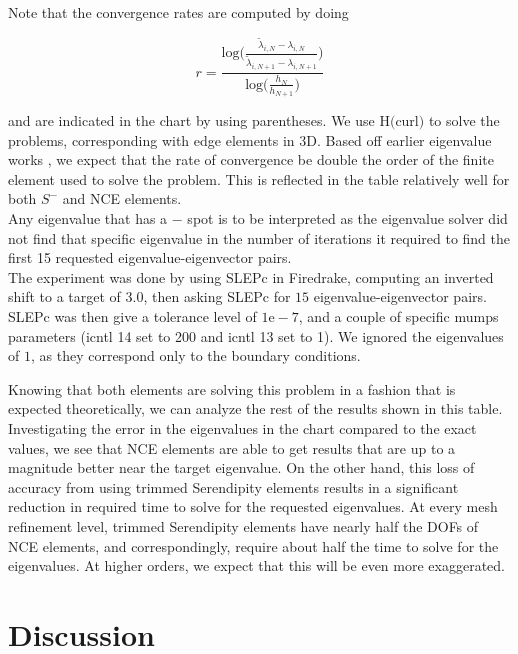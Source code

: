 \documentclass[manuscript,screen]{acmart}
\begin{document}
Note that the convergence rates are computed by doing

\[r = \frac{\text{log}\bigg(\frac{\tilde{\lambda}_{i,N} - \lambda_{i,N}}{\tilde{\lambda}_{i,N+1} - \lambda_{i,N+1}} \bigg)}{\text{log}\bigg( \frac{h_N}{h_{N+1}} \bigg)} \]

\noindent and are indicated in the chart by using parentheses.  We use H$($curl$)$ to solve the problems, corresponding with edge elements in 3D.  Based off earlier eigenvalue works \cite{boffi2010finite}, we expect that the rate of convergence be double the order of the finite element used to solve the problem.  This is reflected in the table relatively well for both $S^-$ and NCE elements.\\

Any eigenvalue that has a $-$ spot is to be interpreted as the eigenvalue solver did not find that specific eigenvalue in the number of iterations it required to find the first 15 requested eigenvalue-eigenvector pairs.\\

The experiment was done by using SLEPc in Firedrake, computing an inverted shift to a target of $3.0$, then asking SLEPc for $15$ eigenvalue-eigenvector pairs.  SLEPc was then give a tolerance level of $1\text{e}-7$, and a couple of specific mumps parameters (icntl 14 set to 200 and icntl 13 set to 1).  We ignored the eigenvalues of $1$, as they correspond only to the boundary conditions. 

Knowing that both elements are solving this problem in a fashion that is expected theoretically, we can analyze the rest of the results shown in this table.  Investigating the error in the eigenvalues in the chart compared to the exact values, we see that NCE elements are able to get results that are up to a magnitude better near the target eigenvalue.  On the other hand, this loss of accuracy from using trimmed Serendipity elements results in a significant reduction in required time to solve for the requested eigenvalues.  At every mesh refinement level, trimmed Serendipity elements have nearly half the DOFs of NCE elements, and correspondingly, require about half the time to solve for the eigenvalues.  At higher orders, we expect that this will be even more exaggerated.  \\

\section{Discussion}
\end{document}
